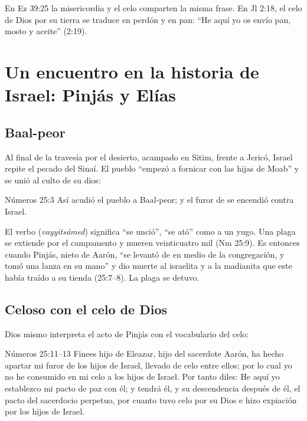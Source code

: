 En Ez 39:25 la misericordia y el celo comparten la misma frase. En Jl 2:18, el celo de Dios por su tierra se traduce en perdón y en pan: ``He aquí yo os envío pan, mosto y aceite'' (2:19).


\section{Un encuentro en la historia de Israel: Pinjás y Elías}

\subsection{Baal-peor}
Al final de la travesía por el desierto, acampado en Sitim, frente a Jericó, Israel repite el pecado del Sinaí. El pueblo ``empezó a fornicar con las hijas de Moab'' y se unió al culto de su dios:

\begin{verso}{Números 25:3}
Así acudió el pueblo a Baal-peor; y el furor de \SENOR{} se encendió contra Israel.
\end{verso}

El verbo  (\emph{vayyitsámed}) significa ``se unció'', ``se ató'' como a un yugo. Una plaga se extiende por el campamento y mueren veinticuatro mil (Nm 25:9). Es entonces cuando Pinjás, nieto de Aarón, ``se levantó de en medio de la congregación, y tomó una lanza en su mano'' y dio muerte al israelita y a la madianita que este había traído a su tienda (25:7--8). La plaga se detuvo.

\subsection{Celoso con el celo de Dios}
Dios mismo interpreta el acto de Pinjás con el vocabulario del celo:

\begin{verso}{Números 25:11–13}
Finees hijo de Eleazar, hijo del sacerdote Aarón, ha hecho apartar mi furor de los hijos de Israel, llevado de celo entre ellos; por lo cual yo no he consumido en mi celo a los hijos de Israel. Por tanto diles: He aquí yo establezco mi pacto de paz con él; y tendrá él, y su descendencia después de él, el pacto del sacerdocio perpetuo, por cuanto tuvo celo por su Dios e hizo expiación por los hijos de Israel.
\end{verso}

